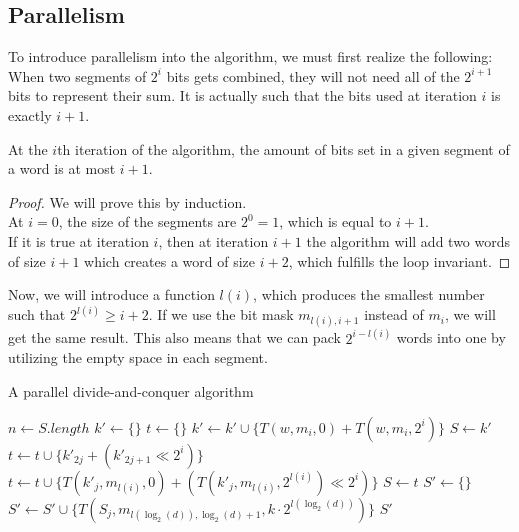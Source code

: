 \subsection{Parallelism}
To introduce parallelism into the algorithm, we must first realize the following: When two segments of $2^i$ bits gets combined, they will not need all of the $2^{i+1}$ bits to represent their sum. It is actually such that the bits used at iteration $i$ is exactly $i+1$.
\begin{invariant}
    \label{thm:amount-of-bits}
    At the $i$th iteration of the algorithm, the amount of bits set in a given segment of a word is at most $i+1$.
\end{invariant}
\begin{proof}
    We will prove this by induction. \\
    At $i=0$, the size of the segments are $2^0 = 1$, which is equal to $i+1$.\\
    If it is true at iteration $i$, then at iteration $i+1$ the algorithm will add two words of size $i+1$ which creates a word of size $i+2$, which fulfills the loop invariant.
\end{proof}
Now, we will introduce a function $l(i)$, which produces the smallest number such that $2^{l(i)} \geq i + 2$. If we use the bit mask $m_{l(i), i+1}$ instead of $m_{i}$, we will get the same result. This also means that we can pack $2^{i-l(i)}$ words into one by utilizing the empty space in each segment.
\begin{algorithm}[H]
\caption{A parallel divide-and-conquer algorithm}\label{alg:parallel-d-and-c}
    \begin{algorithmic}[1]
         
            \State $n \gets S.length$
                \State $k' \gets \{\}$
                \State $t \gets \{\}$
                    \State $k' \gets k' \cup \{T(w, m_i, 0) + T(w, m_i, 2^i)\}$
                \EndFor
                    \State $S \gets k'$
                \Else
                    \State $t \gets t \cup \{k'_{2j} + (k'_{2j+1} \ll 2^i)\}$ %
                    \EndFor
                \Else
                        \State $t \gets t \cup \{T(k'_{j}, m_{l(i)}, 0) + (T(k'_{j}, m_{l(i)}, 2^{l(i)}) \ll 2^{i})\}$
                    \EndFor
                \EndIf
                \State $S \gets t$
                \EndIf
            \EndFor
            \State $S' \gets \{\}$
             
                \State $S' \gets S' \cup \{T(S_j, m_{l(\log_2(d)), \log_2(d) + 1}, k\cdot 2^{l(\log_2(d))})\}$
                \EndFor
            \EndFor
            \State \Return $S'$
        \EndFunction
    \end{algorithmic}
\end{algorithm}
